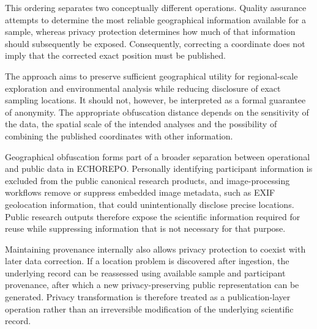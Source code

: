 This ordering separates two conceptually different operations. Quality assurance attempts to determine the most reliable geographical information available for a sample, whereas privacy protection determines how much of that information should subsequently be exposed. Consequently, correcting a coordinate does not imply that the corrected exact position must be published.

The approach aims to preserve sufficient geographical utility for regional-scale exploration and environmental analysis while reducing disclosure of exact sampling locations. It should not, however, be interpreted as a formal guarantee of anonymity. The appropriate obfuscation distance depends on the sensitivity of the data, the spatial scale of the intended analyses and the possibility of combining the published coordinates with other information.

Geographical obfuscation forms part of a broader separation between operational and public data in ECHOREPO. Personally identifying participant information is excluded from the public canonical research products, and image-processing workflows remove or suppress embedded image
metadata, such as EXIF geolocation information, that could unintentionally
disclose precise locations. Public research outputs therefore expose the scientific information required for reuse while suppressing information that is not necessary for that purpose.

Maintaining provenance internally also allows privacy protection to coexist with later data correction. If a location problem is discovered after ingestion, the underlying record can be reassessed using available sample and participant provenance, after which a new privacy-preserving public representation can be generated. Privacy transformation is therefore treated as a publication-layer operation rather than an irreversible modification of the underlying scientific record.